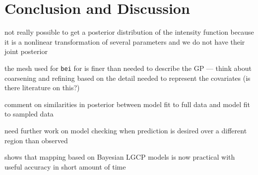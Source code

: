 \documentclass[]{interact}
\begin{document}
\section{Conclusion and Discussion}
\label{conclusion}

not really possible to get a posterior distribution of the intensity function
because it is a nonlinear transformation of several parameters and we do not
have their joint posterior

the mesh used for \texttt{bei} for is finer than needed to describe the
GP --- think about coarsening and refining based on the detail needed to
represent the covariates (is there literature on this?)

comment on similarities in posterior between model fit to full data and model
fit to sampled data

need further work on model checking when prediction is desired over a different
region than observed

shows that mapping based on Bayesian LGCP models is now practical with
useful accuracy in short amount of time





\end{document}
